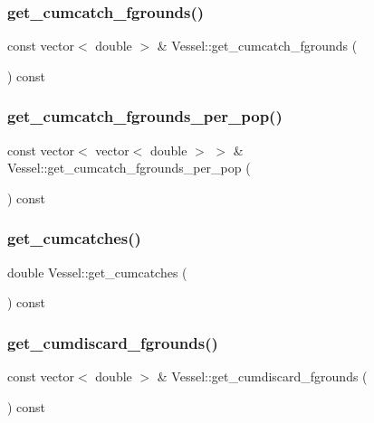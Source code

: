\subsubsection{\texorpdfstring{get\_cumcatch\_fgrounds()}{get\_cumcatch\_fgrounds()}}
{\footnotesize\ttfamily const vector$<$ double $>$ \& Vessel\+::get\+\_\+cumcatch\+\_\+fgrounds (\begin{DoxyParamCaption}{ }\end{DoxyParamCaption}) const}

\mbox{\label{class_vessel_ac1556295e3a3aa5af5920adb6228bfe1}} 
\subsubsection{\texorpdfstring{get\_cumcatch\_fgrounds\_per\_pop()}{get\_cumcatch\_fgrounds\_per\_pop()}}
{\footnotesize\ttfamily const vector$<$ vector$<$ double $>$ $>$ \& Vessel\+::get\+\_\+cumcatch\+\_\+fgrounds\+\_\+per\+\_\+pop (\begin{DoxyParamCaption}{ }\end{DoxyParamCaption}) const}

\mbox{\label{class_vessel_a199997f3fb305ddc062d8d7aac084228}} 
\subsubsection{\texorpdfstring{get\_cumcatches()}{get\_cumcatches()}}
{\footnotesize\ttfamily double Vessel\+::get\+\_\+cumcatches (\begin{DoxyParamCaption}{ }\end{DoxyParamCaption}) const}

\mbox{\label{class_vessel_a8b12cff0da4148840fd0b7da6e2fe391}} 
\subsubsection{\texorpdfstring{get\_cumdiscard\_fgrounds()}{get\_cumdiscard\_fgrounds()}}
{\footnotesize\ttfamily const vector$<$ double $>$ \& Vessel\+::get\+\_\+cumdiscard\+\_\+fgrounds (\begin{DoxyParamCaption}{ }\end{DoxyParamCaption}) const}

